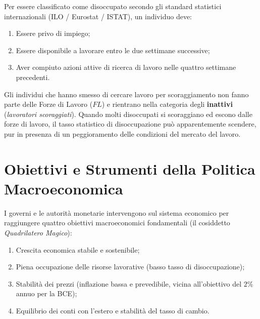 \begin{esame}
Per essere classificato come disoccupato secondo gli standard statistici internazionali (ILO / Eurostat / ISTAT), un individuo deve:
\begin{enumerate}
    \item Essere privo di impiego;
    \item Essere disponibile a lavorare entro le due settimane successive;
    \item Aver compiuto azioni attive di ricerca di lavoro nelle quattro settimane precedenti.
\end{enumerate}
Gli individui che hanno smesso di cercare lavoro per scoraggiamento non fanno parte delle Forze di Lavoro ($FL$) e rientrano nella categoria degli \textbf{inattivi} (\textit{lavoratori scoraggiati}). Quando molti disoccupati si scoraggiano ed escono dalle forze di lavoro, il tasso statistico di disoccupazione può apparentemente scendere, pur in presenza di un peggioramento delle condizioni del mercato del lavoro.
\end{esame}

\section{Obiettivi e Strumenti della Politica Macroeconomica}

I governi e le autorità monetarie intervengono sul sistema economico per raggiungere quattro obiettivi macroeconomici fondamentali (il cosiddetto \textit{Quadrilatero Magico}):
\begin{enumerate}
    \item Crescita economica stabile e sostenibile;
    \item Piena occupazione delle risorse lavorative (basso tasso di disoccupazione);
    \item Stabilità dei prezzi (inflazione bassa e prevedibile, vicina all'obiettivo del $2\%$ annuo per la BCE);
    \item Equilibrio dei conti con l'estero e stabilità del tasso di cambio.
\end{enumerate}

